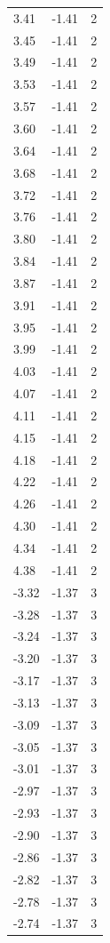 \begin{longtable}{lrr}
  3.41 & -1.41 & 2 \\
  3.45 & -1.41 & 2 \\
  3.49 & -1.41 & 2 \\
  3.53 & -1.41 & 2 \\
  3.57 & -1.41 & 2 \\
  3.60 & -1.41 & 2 \\
  3.64 & -1.41 & 2 \\
  3.68 & -1.41 & 2 \\
  3.72 & -1.41 & 2 \\
  3.76 & -1.41 & 2 \\
  3.80 & -1.41 & 2 \\
  3.84 & -1.41 & 2 \\
  3.87 & -1.41 & 2 \\
  3.91 & -1.41 & 2 \\
  3.95 & -1.41 & 2 \\
  3.99 & -1.41 & 2 \\
  4.03 & -1.41 & 2 \\
  4.07 & -1.41 & 2 \\
  4.11 & -1.41 & 2 \\
  4.15 & -1.41 & 2 \\
  4.18 & -1.41 & 2 \\
  4.22 & -1.41 & 2 \\
  4.26 & -1.41 & 2 \\
  4.30 & -1.41 & 2 \\
  4.34 & -1.41 & 2 \\
  4.38 & -1.41 & 2 \\
  -3.32 & -1.37 & 3 \\
  -3.28 & -1.37 & 3 \\
  -3.24 & -1.37 & 3 \\
  -3.20 & -1.37 & 3 \\
  -3.17 & -1.37 & 3 \\
  -3.13 & -1.37 & 3 \\
  -3.09 & -1.37 & 3 \\
  -3.05 & -1.37 & 3 \\
  -3.01 & -1.37 & 3 \\
  -2.97 & -1.37 & 3 \\
  -2.93 & -1.37 & 3 \\
  -2.90 & -1.37 & 3 \\
  -2.86 & -1.37 & 3 \\
  -2.82 & -1.37 & 3 \\
  -2.78 & -1.37 & 3 \\
  -2.74 & -1.37 & 3 \\

\end{longtable}
